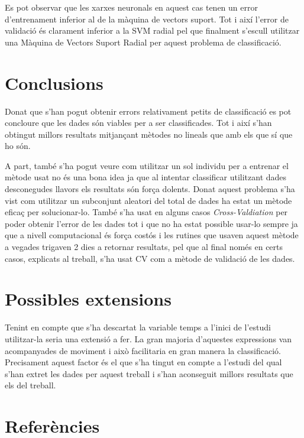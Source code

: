 \documentclass[a4paper]{article}
\begin{document}
Es pot observar que les xarxes neuronals en aquest cas tenen un error d'entrenament inferior al de la màquina de vectors suport. Tot i així l'error de validació és clarament inferior a la SVM radial pel que finalment s'escull utilitzar una Màquina de Vectors Suport Radial per aquest problema de classificació.

\newpage
\section{Conclusions}

Donat que s'han pogut obtenir errors relativament petits de classificació es pot concloure que les dades són viables per a ser classificades. Tot i així s'han obtingut millors resultats mitjançant mètodes no lineals que amb els que sí que ho són. 

A part, també s'ha pogut veure com utilitzar un sol individu per a entrenar el mètode usat no és una bona idea ja que al intentar classificar utilitzant dades desconegudes llavors els resultats són força dolents. Donat aquest problema s'ha vist com utilitzar un subconjunt aleatori del total de dades ha estat un mètode eficaç per solucionar-lo. També s'ha usat en alguns casos \emph{Cross-Valdiation} per poder obtenir l'error de les dades tot i que no ha estat possible usar-lo sempre ja que a nivell computacional és força costós i les rutines que usaven aquest mètode a vegades trigaven 2 dies a retornar resultats, pel que al final només en certs casos, explicats al treball, s'ha usat CV com a mètode de validació de les dades. 

\section{Possibles extensions}

Tenint en compte que s'ha descartat la variable temps a l'inici de l'estudi utilitzar-la seria una extensió a fer. La gran majoria d'aquestes expressions van acompanyades de moviment i això facilitaria en gran manera la classificació. Precisament aquest factor és el que s'ha tingut en compte a l'estudi del qual s'han extret les dades per aquest treball i s'han aconseguit millors resultats que els del treball. 

\section{Referències}



\end{document}
